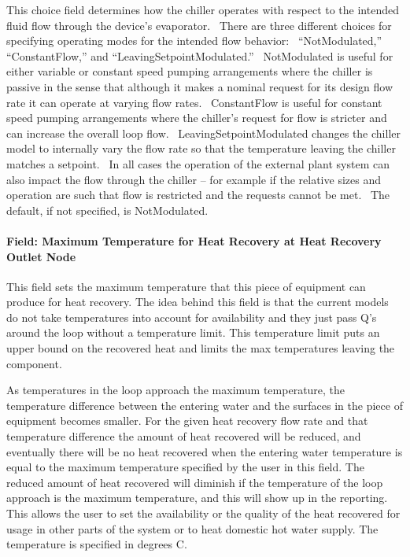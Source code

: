 This choice field determines how the chiller operates with respect to the intended fluid flow through the device's evaporator.~ There are three different choices for specifying operating modes for the intended flow behavior:~ ``NotModulated,'' ``ConstantFlow,'' and ``LeavingSetpointModulated.''~ NotModulated is useful for either variable or constant speed pumping arrangements where the chiller is passive in the sense that although it makes a nominal request for its design flow rate it can operate at varying flow rates.~ ConstantFlow is useful for constant speed pumping arrangements where the chiller's request for flow is stricter and can increase the overall loop flow.~ LeavingSetpointModulated changes the chiller model to internally vary the flow rate so that the temperature leaving the chiller matches a setpoint.~ In all cases the operation of the external plant system can also impact the flow through the chiller -- for example if the relative sizes and operation are such that flow is restricted and the requests cannot be met.~ The default, if not specified, is NotModulated.

\paragraph{Field: Maximum Temperature for Heat Recovery at Heat Recovery Outlet Node}\label{field-maximum-temperature-for-heat-recovery-at-heat-recovery-outlet-node}

This field sets the maximum temperature that this piece of equipment can produce for heat recovery. The idea behind this field is that the current models do not take temperatures into account for availability and they just pass Q's around the loop without a temperature limit. This temperature limit puts an upper bound on the recovered heat and limits the max temperatures leaving the component.

As temperatures in the loop approach the maximum temperature, the temperature difference between the entering water and the surfaces in the piece of equipment becomes smaller. For the given heat recovery flow rate and that temperature difference the amount of heat recovered will be reduced, and eventually there will be no heat recovered when the entering water temperature is equal to the maximum temperature specified by the user in this field. The reduced amount of heat recovered will diminish if the temperature of the loop approach is the maximum temperature, and this will show up in the reporting. This allows the user to set the availability or the quality of the heat recovered for usage in other parts of the system or to heat domestic hot water supply. The temperature is specified in degrees C.

